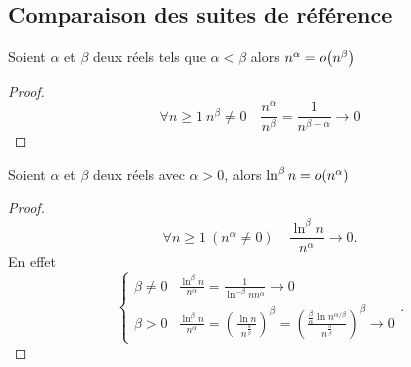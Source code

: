 \subsection{Comparaison des suites de référence}

\begin{prop}
  Soient $\alpha$ et $\beta$ deux réels tels que $\alpha < \beta$ alors $n^\alpha = o\mathopen{}\left(n^\beta\right)$
\end{prop}
\begin{proof}
  \begin{equation}
    \forall n \geq 1 \ n^\beta \neq 0 \quad \frac{n^\alpha}{n^\beta}=\frac{1}{n^{\beta-\alpha}} \rightarrow 0
  \end{equation}
\end{proof}

\begin{prop}
  Soient $\alpha$ et $\beta$ deux réels avec $\alpha>0$, alors $\ln^\beta n = o\mathopen{}\left(n^\alpha\right)$
\end{prop}
\begin{proof}
  \begin{equation}
    \forall n \geq 1 \ (n^\alpha \neq 0) \quad \frac{\ln^\beta n}{n^\alpha} \rightarrow 0.
  \end{equation}
En effet
\begin{equation}
  \begin{cases}
    \beta \neq 0 & \frac{\ln^\beta n}{n^\alpha}=\frac{1}{\ln^{-\beta} n n^\alpha} \rightarrow 0 \\
    \beta > 0 & \frac{\ln^\beta n}{n^\alpha} = \left(\frac{\ln n}{n^{\frac{\alpha}{\beta}}}\right)^\beta = \left(\frac{\frac{\beta}{\alpha}\ln n^{\alpha/\beta}}{n^{\frac{\alpha}{\beta}}}\right)^\beta \rightarrow 0
  \end{cases}.
\end{equation}
\end{proof}

